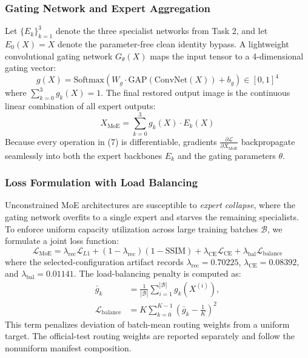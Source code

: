 \documentclass[journal,compsoc]{IEEEtran}
\begin{document}
\subsubsection{Gating Network and Expert Aggregation}
Let $\{E_k\}_{k=1}^3$ denote the three specialist networks from Task 2, and let $E_0(X) = X$ denote the parameter-free clean identity bypass. A lightweight convolutional gating network $G_\theta(X)$ maps the input tensor to a 4-dimensional gating vector:
\begin{equation}
    g(X) = \text{Softmax}(W_g \cdot \text{GAP}(\text{ConvNet}(X)) + b_g) \in [0, 1]^4
\end{equation}
where $\sum_{k=0}^3 g_k(X) = 1$. The final restored output image is the continuous linear combination of all expert outputs:
\begin{equation}
    X_{\text{MoE}} = \sum_{k=0}^3 g_k(X) \cdot E_k(X)
\end{equation}
Because every operation in (7) is differentiable, gradients $\frac{\partial \mathcal{L}}{\partial X_{\text{MoE}}}$ backpropagate seamlessly into both the expert backbones $E_k$ and the gating parameters $\theta$.

\subsubsection{Loss Formulation with Load Balancing}
Unconstrained MoE architectures are susceptible to \textit{expert collapse}, where the gating network overfits to a single expert and starves the remaining specialists. To enforce uniform capacity utilization across large training batches $\mathcal{B}$, we formulate a joint loss function:
\begin{equation}
    \mathcal{L}_{\text{MoE}} = \lambda_{\text{rec}} \mathcal{L}_{L1} + (1-\lambda_{\text{rec}})(1-\text{SSIM}) + \lambda_{\text{CE}}\mathcal{L}_{\text{CE}} + \lambda_{\text{bal}}\mathcal{L}_{\text{balance}}
\end{equation}
where the selected-configuration artifact records $\lambda_{\text{rec}}=0.70225$, $\lambda_{\text{CE}}=0.08392$, and $\lambda_{\text{bal}}=0.01141$. The load-balancing penalty is computed as:
\begin{equation}
\begin{aligned}
    \bar{g}_k &= \frac{1}{|\mathcal{B}|} \sum_{i=1}^{|\mathcal{B}|} g_k(X^{(i)}), \\
    \mathcal{L}_{\text{balance}} &= K \sum_{k=0}^{K-1} \left(\bar{g}_k - \frac{1}{K}\right)^2
\end{aligned}
\end{equation}
This term penalizes deviation of batch-mean routing weights from a uniform target. The official-test routing weights are reported separately and follow the nonuniform manifest composition.
\end{document}
